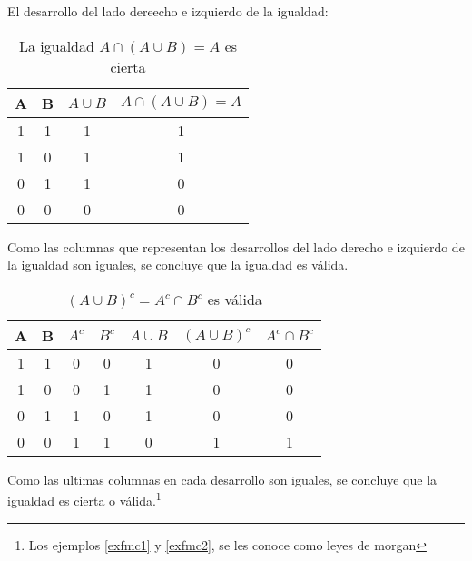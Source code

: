 \begin{example}[Sean $A\subseteq U$ y $B\subseteq U$, demuestre que  $A\cap (A\cup B) =A$]
	\label{exfmc1}
	El desarrollo del lado dereecho e izquierdo de la igualdad:
	\begin{table}[h!]
		\centering
		\begin{tabular}{|c|c|c|c|}
			\hline
			A & B & $A\cup B$ & $A\cap (A\cup B) =A$ \\ \hline
			1 & 1 & 1         & 1                    \\ \hline
			1 & 0 & 1         & 1                    \\ \hline
			0 & 1 & 1         & 0                    \\ \hline
			0 & 0 & 0         & 0                    \\ \hline
		\end{tabular}
		\caption{La igualdad $A\cap (A\cup B) =A$ es cierta}
		\label{tabfmc15}
	\end{table}
	Como las columnas que representan los desarrollos del lado derecho e izquierdo de la igualdad son iguales, se concluye que la igualdad es válida.
\end{example}

\begin{example}[Sean $A$ y $B$ subconjuntos del conjunto $U$, demuestre que $(A\cup B)^{c}=A^{C}\cap B^{c}$]
	\label{exfmc2}
	\begin{table}[h!]
		\centering
		\begin{tabular}{|c|c|c|c|c|c|c|}
			\hline
			A & B & $A^{c}$ & $B^{c}$ & $A\cup B$ & $(A\cup B)^{c}$ & $A^{c}\cap B^{c}$ \\ \hline
			1 & 1 & 0       & 0       & 1         & 0               & 0                 \\ \hline
			1 & 0 & 0       & 1       & 1         & 0               & 0                 \\ \hline
			0 & 1 & 1       & 0       & 1         & 0               & 0                 \\ \hline
			0 & 0 & 1       & 1       & 0         & 1               & 1                 \\ \hline
		\end{tabular}
		\caption{$(A\cup B)^{c}=A^{c}\cap B^{c}$ es válida}
		\label{tabfmc16}
	\end{table}

	Como las ultimas columnas en cada desarrollo son iguales, se concluye que la igualdad es cierta o válida.\footnote{Los ejemplos \ref{exfmc1} y \ref{exfmc2}, se les conoce como leyes de morgan}
\end{example}

